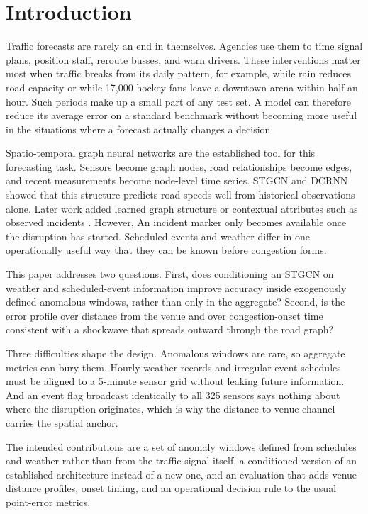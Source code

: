 \documentclass[letterpaper]{article}
\begin{document}
\section{Introduction}

Traffic forecasts are rarely an end in themselves. Agencies use them to time signal plans, position staff, reroute busses, and warn drivers. These interventions matter most when traffic breaks from its daily pattern, for example, while rain reduces road capacity or while 17,000 hockey fans leave a downtown arena within half an hour. Such periods make up a small part of any test set. A model can therefore reduce its average error on a standard benchmark without becoming more useful in the situations where a forecast actually changes a decision.

Spatio-temporal graph neural networks are the established tool for this forecasting task. Sensors become graph nodes, road relationships become edges, and recent measurements become node-level time series. STGCN \cite{yu2018stgcn} and DCRNN \cite{li2018dcrnn} showed that this structure predicts road speeds well from historical observations alone. Later work added learned graph structure \cite{wu2019graphwavenet,bai2020agcrn} or contextual attributes such as observed incidents \cite{fan2026igstgnn}. However, An incident marker only becomes available once the disruption has started. Scheduled events and weather differ in one operationally useful way that they can be known before congestion forms.

This paper addresses two questions. First, does conditioning an STGCN on weather and scheduled-event information improve accuracy inside exogenously defined anomalous windows, rather than only in the aggregate? Second, is the error profile over distance from the venue and over congestion-onset time consistent with a shockwave that spreads outward through the road graph?

Three difficulties shape the design. Anomalous windows are rare, so aggregate metrics can bury them. Hourly weather records and irregular event schedules must be aligned to a 5-minute sensor grid without leaking future information. And an event flag broadcast identically to all 325 sensors says nothing about where the disruption originates, which is why the distance-to-venue channel carries the spatial anchor.

The intended contributions are a set of anomaly windows defined from schedules and weather rather than from the traffic signal itself, a conditioned version of an established architecture instead of a new one, and an evaluation that adds venue-distance profiles, onset timing, and an operational decision rule to the usual point-error metrics.
\end{document}
